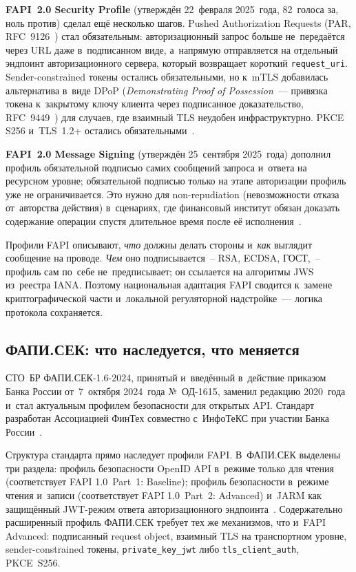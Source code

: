 \textbf{FAPI~2.0 Security Profile} (утверждён 22~февраля
2025~года, 82~голоса за, ноль против) сделал ещё несколько шагов.
Pushed Authorization Requests (PAR, RFC~9126~\cite{rfc-9126-par})
стал обязательным: авторизационный запрос больше не~передаётся
через URL даже в~подписанном виде, а~напрямую отправляется
на отдельный эндпоинт авторизационного сервера, который возвращает
короткий \texttt{request\_uri}. Sender-constrained токены остались
обязательными, но к~mTLS добавилась альтернатива в~виде DPoP
(\textit{Demonstrating Proof of Possession}~--- привязка токена
к~закрытому ключу клиента через подписанное доказательство,
RFC~9449~\cite{rfc-9449-dpop}) для случаев, где взаимный TLS
неудобен инфраструктурно. PKCE S256 и~TLS~1.2+ остались
обязательными~\cite{fapi-2-security-profile}.

\textbf{FAPI~2.0 Message Signing} (утверждён 25~сентября
2025~года) дополнил профиль обязательной подписью самих сообщений
запроса и~ответа на ресурсном уровне; обязательной подписью только
на этапе авторизации профиль уже не ограничивается. Это нужно для non-repudiation (невозможности отказа от~авторства
действия) в~сценариях, где
финансовый институт обязан доказать содержание операции спустя
длительное время после её исполнения~\cite{fapi-2-message-signing}.

Профили FAPI описывают, \emph{что} должны делать стороны и~\emph{как}
выглядит сообщение на проводе. \emph{Чем} оно подписывается~--
RSA, ECDSA, ГОСТ,~-- профиль сам по~себе не~предписывает; он
ссылается на алгоритмы JWS из~реестра IANA. Поэтому национальная
адаптация FAPI сводится к~замене криптографической части
и~локальной регуляторной надстройке~--- логика протокола
сохраняется.

\subsection*{ФАПИ.СЕК: что наследуется, что меняется}

СТО~БР ФАПИ.СЕК-1.6-2024, принятый и~введённый в~действие приказом
Банка России от~7~октября 2024~года №~ОД-1615, заменил редакцию
2020~года и~стал актуальным профилем безопасности для
открытых API. Стандарт разработан Ассоциацией ФинТех совместно
с~ИнфоТеКС при участии Банка
России~\cite{fapi-sec-2024,cbr-fapi-sec-9908}.

Структура стандарта прямо наследует профили FAPI. В~ФАПИ.СЕК
выделены три раздела: профиль безопасности OpenID API в~режиме
только для чтения (соответствует FAPI 1.0~Part~1: Baseline);
профиль безопасности в~режиме чтения и~записи (соответствует
FAPI 1.0~Part~2: Advanced) и~JARM как защищённый JWT-режим ответа
авторизационного эндпоинта~\cite{fapi-sec-2024,fapi-1-part1,fapi-1-part2,oidf-jarm}.
Содержательно расширенный профиль ФАПИ.СЕК требует тех же
механизмов, что и~FAPI Advanced: подписанный request object,
взаимный TLS на транспортном уровне, sender-constrained токены,
\texttt{private\_key\_jwt} либо \texttt{tls\_client\_auth}, PKCE~S256.

